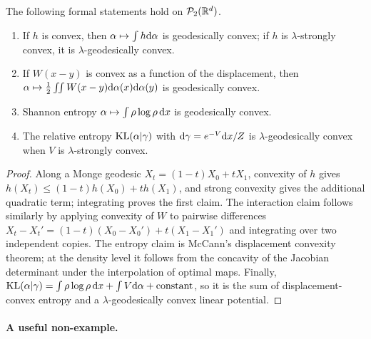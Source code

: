 \begin{prop}\label{prop-basic-geodesic-convexity}
	The following formal statements hold on $\mathcal{P}_2(\mathbb{R}^d)$.
	\begin{enumerate}
		\item If $h$ is convex, then $\alpha\mapsto\int h\mathrm{d}\alpha$ is geodesically convex; if $h$ is $\lambda$-strongly convex, it is $\lambda$-geodesically convex.
		\item If $W(x-y)$ is convex as a function of the displacement, then $\alpha\mapsto\frac12\iint W(x-y)\mathrm{d}\alpha(x)\mathrm{d}\alpha(y)$ is geodesically convex.
		\item Shannon entropy $\alpha\mapsto\int\rho\log\rho\,\mathrm{d} x$ is geodesically convex.
		\item The relative entropy $\operatorname{KL}(\alpha|\gamma)$ with $\mathrm{d}\gamma=e^{-V}\mathrm{d} x/Z$ is $\lambda$-geodesically convex when $V$ is $\lambda$-strongly convex.
	\end{enumerate}
\end{prop}
\begin{proof}
	Along a Monge geodesic $X_t=(1-t)X_0+tX_1$, convexity of $h$ gives $h(X_t)\leq(1-t)h(X_0)+t h(X_1)$, and strong convexity gives the additional quadratic term; integrating proves the first claim. The interaction claim follows similarly by applying convexity of $W$ to pairwise differences $X_t-X_t'=(1-t)(X_0-X_0')+t(X_1-X_1')$ and integrating over two independent copies. The entropy claim is McCann's displacement convexity theorem; at the density level it follows from the concavity of the Jacobian determinant under the interpolation of optimal maps. Finally, $\operatorname{KL}(\alpha|\gamma)=\int\rho\log\rho\,\mathrm{d} x+\int V\mathrm{d}\alpha+\mathrm{constant}$, so it is the sum of displacement-convex entropy and a $\lambda$-geodesically convex linear potential.
\end{proof}

\paragraph{A useful non-example.}

